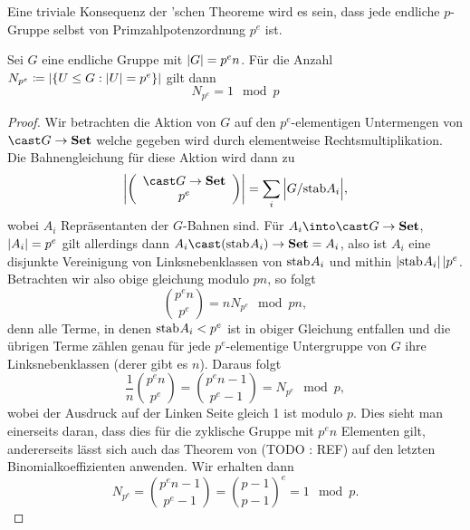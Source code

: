\documentclass{article}
\begin{document}
\begin{remark}
    Eine triviale Konsequenz der 'schen Theoreme wird es sein, dass jede endliche $p$-Gruppe selbst von
    Primzahlpotenzordnung $p^e$ ist.
\end{remark}
%
\begin{theorem}
    Sei $G$ eine endliche Gruppe mit $\left\vert{G}\right\vert = p^e n$. Für die Anzahl $N_{p^e}\defeq \size{\set{U\leq G}[\size U=p^e]}$ gilt dann
    $$
    N_{p^e} = 1 \mod p
    $$
\end{theorem}
%
\begin{proof}
    Wir betrachten die Aktion von $G$ auf den $p^e$-elementigen Untermengen von $\cast G \to \Set$ welche gegeben wird durch
    elementweise Rechtsmultiplikation. Die Bahnengleichung für diese Aktion wird dann zu
    $$
    \size {\binom {\cast G \to \Set} {p^e}} = \sum_i {\size {G/\stab A_i}},
    $$
    wobei $A_i$ Repräsentanten der $G$-Bahnen sind.
    Für $A_i\into \cast G \to \Set$, $\left\vert{A_i}\right\vert=p^e$ gilt allerdings dann $A_i \cast (\stab A_i) \to \Set=A_i$, also ist $A_i$ eine disjunkte
    Vereinigung von Linksnebenklassen von $\stab A_i$ und mithin $\size {\stab A_i}\divides p^e$. Betrachten wir also obige
    gleichung modulo $pn$, so folgt
    $$
    \binom {p^e n}{p^e} = n N_{p^e} \mod pn, 
    $$
    denn alle Terme, in denen $\stab A_i<p^e$ ist in obiger Gleichung entfallen und die übrigen Terme zählen genau für jede
    $p^e$-elementige Untergruppe von $G$ ihre Linksnebenklassen (derer gibt es $n$).
    Daraus folgt
    $$
    \frac 1 n \binom {p^e n}{p^e} = \binom {p^e n-1} {p^e-1} = N_{p^e} \mod p,
    $$
    wobei der Ausdruck auf der Linken Seite gleich 1 ist modulo $p$. Dies sieht man einerseits daran, dass dies für die zyklische
    Gruppe mit $p^e n$ Elementen gilt, andererseits lässt sich auch das Theorem von  (TODO : REF) auf den letzten
    Binomialkoeffizienten anwenden. Wir erhalten dann
    $$
    N_{p^e} = \binom {p^e n - 1} {p^e -1} = {\binom {p-1} {p-1}}^e = 1 \mod p.
    $$
\end{proof}

\end{document}
